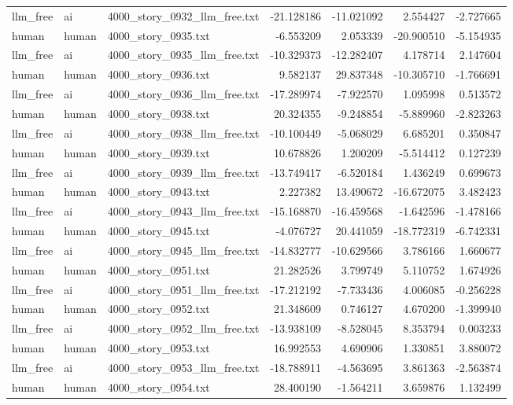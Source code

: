 \begin{longtable}{lllrrrr}
llm\_free & ai & 4000\_story\_0932\_llm\_free.txt & -21.128186 & -11.021092 & 2.554427 & -2.727665 \\
human & human & 4000\_story\_0935.txt & -6.553209 & 2.053339 & -20.900510 & -5.154935 \\
llm\_free & ai & 4000\_story\_0935\_llm\_free.txt & -10.329373 & -12.282407 & 4.178714 & 2.147604 \\
human & human & 4000\_story\_0936.txt & 9.582137 & 29.837348 & -10.305710 & -1.766691 \\
llm\_free & ai & 4000\_story\_0936\_llm\_free.txt & -17.289974 & -7.922570 & 1.095998 & 0.513572 \\
human & human & 4000\_story\_0938.txt & 20.324355 & -9.248854 & -5.889960 & -2.823263 \\
llm\_free & ai & 4000\_story\_0938\_llm\_free.txt & -10.100449 & -5.068029 & 6.685201 & 0.350847 \\
human & human & 4000\_story\_0939.txt & 10.678826 & 1.200209 & -5.514412 & 0.127239 \\
llm\_free & ai & 4000\_story\_0939\_llm\_free.txt & -13.749417 & -6.520184 & 1.436249 & 0.699673 \\
human & human & 4000\_story\_0943.txt & 2.227382 & 13.490672 & -16.672075 & 3.482423 \\
llm\_free & ai & 4000\_story\_0943\_llm\_free.txt & -15.168870 & -16.459568 & -1.642596 & -1.478166 \\
human & human & 4000\_story\_0945.txt & -4.076727 & 20.441059 & -18.772319 & -6.742331 \\
llm\_free & ai & 4000\_story\_0945\_llm\_free.txt & -14.832777 & -10.629566 & 3.786166 & 1.660677 \\
human & human & 4000\_story\_0951.txt & 21.282526 & 3.799749 & 5.110752 & 1.674926 \\
llm\_free & ai & 4000\_story\_0951\_llm\_free.txt & -17.212192 & -7.733436 & 4.006085 & -0.256228 \\
human & human & 4000\_story\_0952.txt & 21.348609 & 0.746127 & 4.670200 & -1.399940 \\
llm\_free & ai & 4000\_story\_0952\_llm\_free.txt & -13.938109 & -8.528045 & 8.353794 & 0.003233 \\
human & human & 4000\_story\_0953.txt & 16.992553 & 4.690906 & 1.330851 & 3.880072 \\
llm\_free & ai & 4000\_story\_0953\_llm\_free.txt & -18.788911 & -4.563695 & 3.861363 & -2.563874 \\
human & human & 4000\_story\_0954.txt & 28.400190 & -1.564211 & 3.659876 & 1.132499 \\

\end{longtable}
